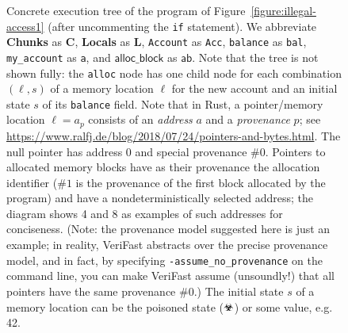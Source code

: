 \documentclass{article}
\newcommand{\poison}{\textrm{\Biohazard}}
\begin{document}
\begin{figure}
\begin{center}
\end{center}
\caption{Concrete execution tree of the program of Figure~\ref{figure:illegal-access1} (after uncommenting the \lstinline|if| statement). We abbreviate \textbf{Chunks} as \textbf{C}, \textbf{Locals} as \textbf{L}, \lstinline|Account| as \lstinline|Acc|, \lstinline|balance| as \lstinline|bal|, \lstinline|my_account| as \lstinline|a|, and $\mathsf{alloc\_block}$ as $\mathsf{ab}$. Note that the tree is not shown fully: the \lstinline|alloc| node has one child node for each combination $(\ell, s)$ of a memory location $\ell$ for the new account and an initial state $s$ of its \lstinline|balance| field. Note that in Rust, a pointer/memory location $\ell = a_p$ consists of an \emph{address} $a$ and a \emph{provenance} $p$; see \url{https://www.ralfj.de/blog/2018/07/24/pointers-and-bytes.html}. The null pointer has address 0 and special provenance $\#0$. Pointers to allocated memory blocks have as their provenance the allocation identifier ($\#1$ is the provenance of the first block allocated by the program) and have a nondeterministically selected address; the diagram shows 4 and 8 as examples of such addresses for conciseness. (Note: the provenance model suggested here is just an example; in reality, VeriFast abstracts over the precise provenance model, and in fact, by specifying \lstinline|-assume_no_provenance| on the command line, you can make VeriFast assume (unsoundly!) that all pointers have the same provenance $\#0$.) The initial state $s$ of a memory location can be the poisoned state ($\poison$) or some value, e.g. 42.}\label{fig:concrete-execution-tree}
\end{figure}
\end{document}
